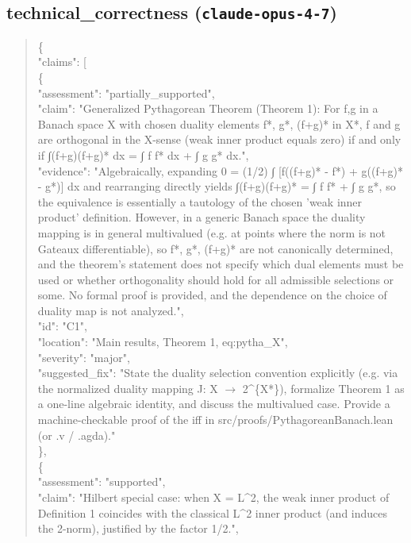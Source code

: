 \documentclass[11pt]{article}
\begin{document}
\subsection*{technical\_correctness (\texttt{claude-opus-4-7})}
\begin{quote}\small\ttfamily\raggedright
\{\\
  "claims": [\\
    \{\\
      "assessment": "partially\_supported",\\
      "claim": "Generalized Pythagorean Theorem (Theorem 1): For f,g in a Banach space X with chosen duality elements f*, g*, (f+g)* in X*, f and g are orthogonal in the X-sense (weak inner product equals zero) if and only if ∫(f+g)(f+g)* dx = ∫ f f* dx + ∫ g g* dx.",\\
      "evidence": "Algebraically, expanding 0 = (1/2) ∫ [f((f+g)* - f*) + g((f+g)* - g*)] dx and rearranging directly yields ∫(f+g)(f+g)* = ∫ f f* + ∫ g g*, so the equivalence is essentially a tautology of the chosen 'weak inner product' definition. However, in a generic Banach space the duality mapping is in general multivalued (e.g. at points where the norm is not Gateaux differentiable), so f*, g*, (f+g)* are not canonically determined, and the theorem's statement does not specify which dual elements must be used or whether orthogonality should hold for all admissible selections or some. No formal proof is provided, and the dependence on the choice of duality map is not analyzed.",\\
      "id": "C1",\\
      "location": "Main results, Theorem 1, eq:pytha\_X",\\
      "severity": "major",\\
      "suggested\_fix": "State the duality selection convention explicitly (e.g. via the normalized duality mapping J: X \ensuremath{\to} 2\^{}\{X*\}), formalize Theorem 1 as a one-line algebraic identity, and discuss the multivalued case. Provide a machine-checkable proof of the iff in src/proofs/PythagoreanBanach.lean (or .v / .agda)."\\
    \},\\
    \{\\
      "assessment": "supported",\\
      "claim": "Hilbert special case: when X = L\^{}2, the weak inner product of Definition 1 coincides with the classical L\^{}2 inner product (and induces the 2-norm), justified by the factor 1/2.",\\

\end{quote}
\end{document}
